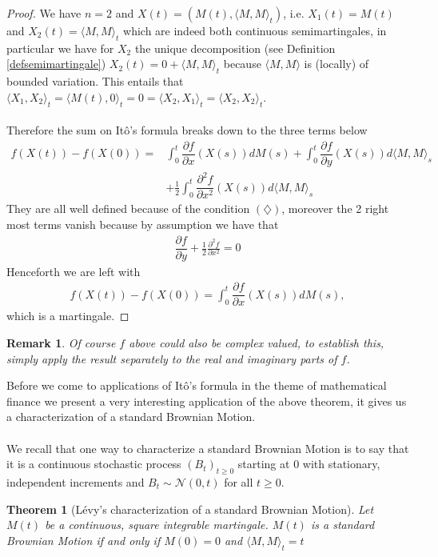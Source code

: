 \documentclass[11pt,a4paper, final]{article}
\newtheorem{thm}{Theorem}[section]
\newtheorem{rem}{Remark}[defn]
\begin{document}
\begin{proof}
We have $n=2$ and $X(t)=(M(t), \langle M, M \rangle_t)$, i.e. $X_1(t)=  M(t)$ and $X_2(t)= \langle M, M \rangle_t$ which are indeed both continuous semimartingales, in particular we have for $X_2$ the unique decomposition (see Definition \ref{defsemimartingale}) $X_2(t)=0 + \langle M, M \rangle_t$ because $\langle M, M \rangle$ is (locally) of bounded variation. This entails that $\langle X_1, X_2 \rangle_t = \langle M(t), 0 \rangle_t=0= \langle X_2, X_1 \rangle_t = \langle X_2, X_2 \rangle_t$.  
\\\\
Therefore the sum on Itô's formula breaks down to the three terms below
\begin{align*}
f(X(t))-f(X(0)) = &\int_0^t \dfrac{\partial f}{\partial x}(X(s))dM(s) + \int_0^t \dfrac{\partial f}{\partial y}(X(s)) d \langle M, M \rangle_s  \\
& +\frac{1}{2} \int_0^t \dfrac{\partial^2f}{\partial x^2}(X(s)) d \langle M, M \rangle_s 
\end{align*}
They are all well defined because of the condition $(\diamondsuit)$, moreover the 2 right most terms vanish because by assumption we have that 
\begin{align*}
\dfrac{\partial f}{\partial y}+ \frac{1}{2} \frac{\partial^2 f}{\partial x^2} =0
\end{align*}
Henceforth we are left with
\begin{align*}
f(X(t))-f(X(0)) = \int_0^t \dfrac{\partial f}{\partial x} (X(s)) dM(s),
\end{align*}
which is a martingale. 
\end{proof}
\begin{rem} Of course $f$ above could also be complex valued, to establish this, simply apply the result separately to the real and imaginary parts of $f$.
\end{rem}
\noindent Before we come to applications of Itô's formula in the theme of mathematical finance we present a very interesting application of the above theorem, it gives us a characterization of a standard Brownian Motion. 
\\\\
We recall that one way to characterize a standard Brownian Motion is to say that it is a continuous stochastic process $(B_t)_{t \geq 0}$ starting at $0$ with stationary, independent increments and $B_t \sim \mathcal{N}(0,t)$ for all $t \geq 0$. 
\newpage
\begin{thm}[Lévy's characterization of a standard Brownian Motion] Let $M(t)$ be a continuous, square integrable martingale. $M(t)$ is a standard Brownian Motion if and only if $M(0)=0$ and $\langle M,M \rangle_t = t$
\end{thm}
\end{document}
